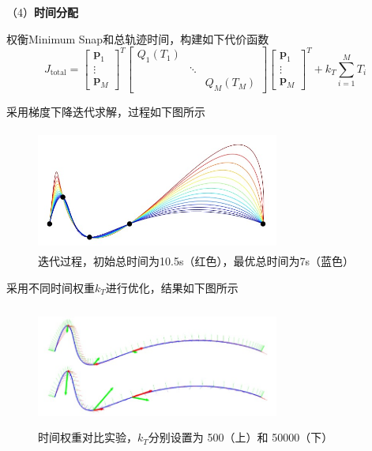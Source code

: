 （4）\textbf{时间分配}


权衡Minimum Snap和总轨迹时间，构建如下代价函数
\begin{equation}\label{fun2}
    J_{\text{total}} = 
    \begin{bmatrix}
    \mathbf{p}_1 \\
    \vdots \\
    \mathbf{p}_M
    \end{bmatrix}^T
    \begin{bmatrix}
    Q_1(T_1) \\
    & \ddots \\
    && Q_M(T_M)
    \end{bmatrix}
    \begin{bmatrix}
    \mathbf{p}_1 \\
    \vdots \\
    \mathbf{p}_M
    \end{bmatrix}^T +k_T\sum_{i=1}^MT_i   
\end{equation}


采用梯度下降迭代求解，过程如下图所示
\begin{figure}[htbp]
    \centering
    \includegraphics[width=8cm, height=4cm]{image/poly1.jpg}
    \caption{迭代过程，初始总时间为10.5s（红色），最优总时间为7s（蓝色）}\label{poly1}
\end{figure}


采用不同时间权重$k_T$进行优化，结果如下图所示
\begin{figure}[htbp]
    \centering
    \includegraphics[width=8cm, height=4cm]{image/poly2.jpg}
    \caption{时间权重对比实验，$k_T$分别设置为 500（上）和 50000（下）}\label{poly2}
\end{figure}


